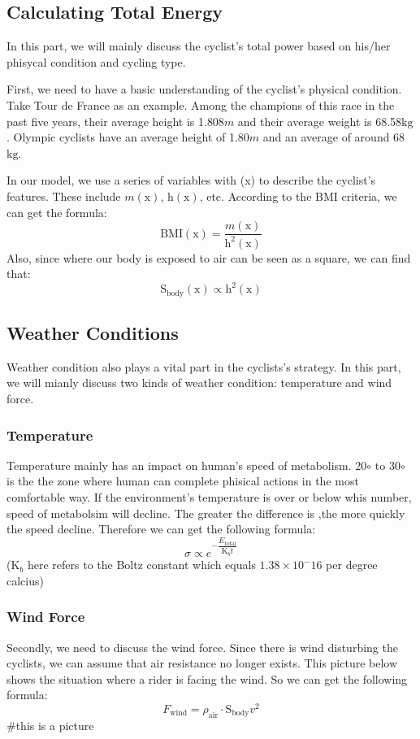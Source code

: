 \documentclass{article}
\begin{document}
		\subsection{Calculating Total Energy}
			In this part, we will mainly discuss the cyclist's total power based on his/her phisycal condition and cycling type.

			First, we need to have a basic understanding of the cyclist's physical condition. Take Tour de France as an example\cite{france}. Among the champions of this race in the past five years, their average height is 1.808$m$ and their average weight is 68.58$\mathrm{kg}$. Olympic cyclists have an average height of 1.80$m$ and an average of around 68$\mathrm{kg}$\cite{weight}.

			In our model, we use a series of variables with (x) to describe the cyclist's features. These include $m(\mathrm{x})$, $\mathrm{h}(\mathrm{x})$, etc. According to the BMI criteria, we can get the formula:
			$$\mathrm{BMI}(\mathrm{x})=\dfrac{m(\mathrm{x})}{\mathrm{h}^2(\mathrm{x})}$$
			Also, since where our body is exposed to air can be seen as a square, we can find that:
			$$\mathrm{S}_\mathrm{body}(\mathrm{x})\propto\mathrm{h}^2(\mathrm{x})$$
		\subsection{Weather Conditions}
			Weather condition also plays a vital part in the cyclists's strategy. In this part, we will mianly discuss two kinds of weather condition: temperature and wind force.
		\subsubsection{Temperature}
			Temperature mainly has an impact on human's speed of metabolism. 20$\circ$ to 30$\circ$ is the the zone where human can complete phisical actions in the most comfortable way. If the environment's temperature is over or below whis number, speed of metabolsim will decline. The greater the difference is ,the more quickly the speed decline. Therefore we can get the following formula:
			$$\sigma\propto e^{-\dfrac{ E _\mathrm{total}}{\mathrm{K}_ b t}}$$
			($\mathrm{K}_ b $ here refers to the Boltz constant which equals $1.38\times10^-16$ per degree calcius)
			\subsubsection{Wind Force}
			Secondly, we need to discuss the wind force. Since there is wind disturbing the cyclists, we can assume that air resistance no longer exists. This picture below shows the situation where a rider is facing the wind. So we can get the following formula:
			$$F_\mathrm{wind}=\rho_\mathrm{air}\cdot\mathrm{S}_\mathrm{body}v^2$$
			\#this is a picture
\end{document}
